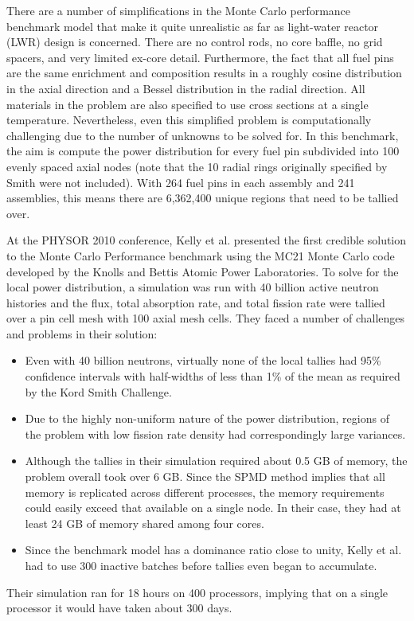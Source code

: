 There are a number of simplifications in the Monte Carlo performance benchmark
model that make it quite unrealistic as far as light-water reactor (LWR) design
is concerned. There are no control rods, no core baffle, no grid spacers, and
very limited ex-core detail. Furthermore, the fact that all fuel pins are the
same enrichment and composition results in a roughly cosine distribution in the
axial direction and a Bessel distribution in the radial direction. All materials
in the problem are also specified to use cross sections at a single
temperature. Nevertheless, even this simplified problem is computationally
challenging due to the number of unknowns to be solved for. In this benchmark,
the aim is compute the power distribution for every fuel pin subdivided into 100
evenly spaced axial nodes (note that the 10 radial rings originally specified by
Smith were not included). With 264 fuel pins in each assembly and 241
assemblies, this means there are 6,362,400 unique regions that need to be
tallied over.

At the PHYSOR 2010 conference, Kelly et al. presented the first credible
solution to the Monte Carlo Performance benchmark \cite{physor-kelly-2010} using
the MC21 Monte Carlo code \cite{mc-sutton-2007} developed by the Knolls and
Bettis Atomic Power Laboratories. To solve for the local power distribution, a
simulation was run with 40 billion active neutron histories and the flux, total
absorption rate, and total fission rate were tallied over a pin cell mesh with
100 axial mesh cells. They faced a number of challenges and problems in their
solution:
\begin{itemize}
\item Even with 40 billion neutrons, virtually none of the local tallies had
  95\% confidence intervals with half-widths of less than 1\% of the mean as
  required by the Kord Smith Challenge.
\item Due to the highly non-uniform nature of the power distribution, regions of
  the problem with low fission rate density had correspondingly large variances.
\item Although the tallies in their simulation required about 0.5 GB of memory,
  the problem overall took over 6 GB. Since the SPMD method implies that all
  memory is replicated across different processes, the memory requirements could
  easily exceed that available on a single node. In their case, they had at
  least 24 GB of memory shared among four cores.
\item Since the benchmark model has a dominance ratio close to unity, Kelly et
  al. had to use 300 inactive batches before tallies even began to accumulate.
\end{itemize}
Their simulation ran for 18 hours on 400 processors, implying that on a single
processor it would have taken about 300 days.

